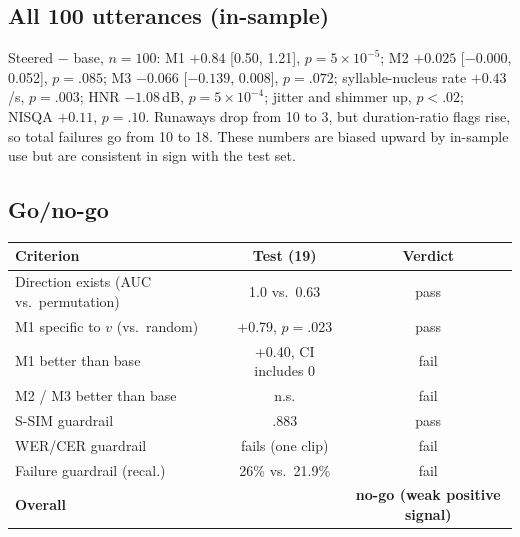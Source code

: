\documentclass[11pt]{article}
\begin{document}
\subsection{All 100 utterances (in-sample)}
\begin{center}
\end{center}
Steered $-$ base, $n=100$: M1 $+0.84$ [0.50, 1.21], $p=5\times10^{-5}$; M2 $+0.025$ [$-0.000$, 0.052], $p=.085$; M3 $-0.066$ [$-0.139$, 0.008], $p=.072$; syllable-nucleus rate $+0.43$/s, $p=.003$; HNR $-1.08$\,dB, $p=5\times10^{-4}$; jitter and shimmer up, $p<.02$; NISQA $+0.11$, $p=.10$. Runaways drop from 10 to 3, but duration-ratio flags rise, so total failures go from 10 to 18. These numbers are biased upward by in-sample use but are consistent in sign with the test set.

\subsection{Go/no-go}
\begin{center}
\begin{tabular}{lcc}
\toprule
Criterion & Test (19) & Verdict \\
\midrule
Direction exists (AUC vs.\ permutation) & 1.0 vs.\ 0.63 & pass \\
M1 specific to $v$ (vs.\ random) & +0.79, $p=.023$ & pass \\
M1 better than base & +0.40, CI includes 0 & fail \\
M2 / M3 better than base & n.s. & fail \\
S-SIM guardrail & .883 & pass \\
WER/CER guardrail & fails (one clip) & fail \\
Failure guardrail (recal.) & 26\% vs.\ 21.9\% & fail \\
\midrule
\textbf{Overall} & & \textbf{no-go (weak positive signal)} \\
\bottomrule
\end{tabular}
\end{center}
\end{document}
